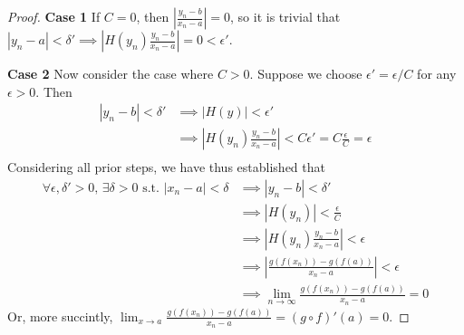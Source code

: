 \documentclass{article}
\begin{document}
\begin{enumerate}
\begin{proof}
      \textbf{Case 1} If $C=0$, then $\left|\frac{y_n - b}{x_n - a}\right| = 0$, so it is trivial that 
      $|y_n - a| < \delta' \implies \left|H(y_n)\frac{y_n - b}{x_n - a}\right| = 0 < \epsilon'$.

      \textbf{Case 2} Now consider the case where $C > 0$. Suppose we choose $\epsilon' = \epsilon/C$ for 
      any $\epsilon > 0$. Then 
      \begin{align*}
        |y_n - b| < \delta' &\implies
        |H(y)| < \epsilon'\\ 
        &\implies
        \left|H(y_n)\frac{y_n - b}{x_n - a}\right| < C\epsilon'=C\frac{\epsilon}{C}=\epsilon\\
      \end{align*}
      Considering all prior steps, we have thus established that 
      \begin{align*}
        \forall \epsilon, \delta' > 0,\, \exists \delta > 0 \text{ s.t. } |x_n - a| < \delta &\implies |y_n - b| < \delta'\\
        &\implies |H(y_n)| < \frac{\epsilon}{C}\\
        &\implies \left|H(y_n)\frac{y_n - b}{x_n - a}\right| < \epsilon\\
        &\implies \left|\frac{g(f(x_n))-g(f(a))}{x_n-a}\right| < \epsilon\\
        &\implies \lim_{n\to\infty}\frac{g(f(x_n))-g(f(a))}{x_n-a} = 0
      \end{align*}
      Or, more succintly, $\lim_{x\to a}\frac{g(f(x_n))-g(f(a))}{x_n-a} = (g\circ f)'(a) = 0$.
    \end{proof}
\end{enumerate}
\end{document}
